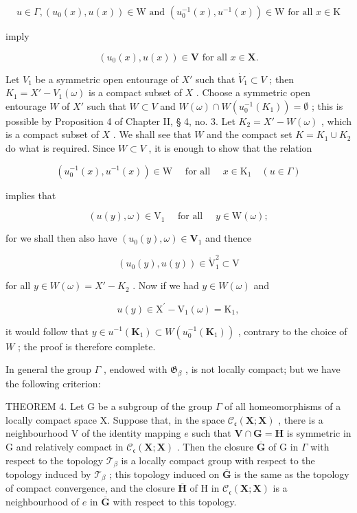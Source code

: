 \[
u \in \Gamma , (u _ {0} (x), u (x)) \in \mathrm{W} \text {   and   } (u _ {0} ^ {- 1} (x), u ^ {- 1} (x)) \in \mathrm{W} \text {   for   all   } x \in \mathrm{K}
\]

imply

\[
(u _ {0} (x), u (x)) \in \mathbf {V} \text {   for   all   } x \in \mathbf {X}.
\]

Let \(V_1\) be a symmetric open entourage of \(X'\) such that \(\dot{V}_1 \subset V\) ; then \(K_1 = X' - V_1(\omega)\) is a compact subset of \(X\) . Choose a symmetric open entourage \(W\) of \(X'\) such that \(W \subset V\) and \(W(\omega) \cap W(u_0^{-1}(K_1)) = \emptyset\) ; this is possible by Proposition 4 of Chapter II, § 4, no. 3. Let \(K_2 = X' - W(\omega)\) , which is a compact subset of \(X\) . We shall see that \(W\) and the compact set \(K = K_1 \cup K_2\) do what is required. Since \(W \subset V\) , it is enough to show that the relation

\[
\left(u _ {0} ^ {- 1} (x), u ^ {- 1} (x)\right) \in \mathrm{W} \quad \text { for   all } \quad x \in \mathrm{K} _ {1} \quad (u \in \Gamma)
\]

implies that

\[
(u (y), \omega) \in \mathrm{V} _ {1} \quad \text { for   all } \quad y \in \mathrm{W} (\omega);
\]

for we shall then also have \((u_0(y),\omega)\in \mathbf{V}_1\) and thence

\[
(u _ {0} (y), u (y)) \in \mathring {\mathrm{V}} _ {1} ^ {2} \subset \mathrm{V}
\]

for all \(y \in W(\omega) = X' - K_2\) . Now if we had \(y \in W(\omega)\) and

\[
u (y) \in \mathrm{X} ^ {\prime} - \mathrm{V} _ {1} (\omega) = \mathrm{K} _ {1},
\]

it would follow that \(y \in u^{-1}(\mathbf{K}_1) \subset W(u_0^{-1}(\mathbf{K}_1))\) , contrary to the choice of \(W\) ; the proof is therefore complete.

In general the group \(\Gamma\) , endowed with \(\mathfrak{G}_{\beta}\) , is not locally compact; but we have the following criterion:

THEOREM 4. Let G be a subgroup of the group \(\Gamma\) of all homeomorphisms of a locally compact space X. Suppose that, in the space \(\mathcal{C}_{\mathfrak{c}}(\mathbf{X};\mathbf{X})\) , there is a neighbourhood V of the identity mapping \(e\) such that \(\mathbf{V}\cap \mathbf{G} = \mathbf{H}\) is symmetric in G and relatively compact in \(\mathcal{C}_{\mathfrak{c}}(\mathbf{X};\mathbf{X})\) . Then the closure \(\overline{\mathbf{G}}\) of G in \(\Gamma\) with respect to the topology \(\mathcal{T}_{\beta}\) is a locally compact group with respect to the topology induced by \(\mathcal{T}_{\beta}\) ; this topology induced on \(\overline{\mathbf{G}}\) is the same as the topology of compact convergence, and the closure \(\overline{\mathbf{H}}\) of H in \(\mathcal{C}_{\mathfrak{c}}(\mathbf{X};\mathbf{X})\) is a neighbourhood of \(e\) in \(\overline{\mathbf{G}}\) with respect to this topology.

